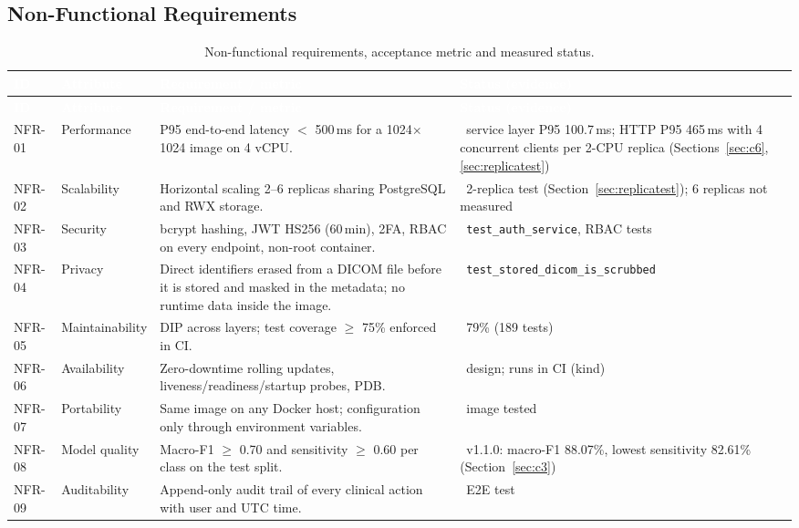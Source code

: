 \documentclass[12pt,a4paper]{article}
\newcommand{\fp}[1]{\nolinkurl{#1}}
\newcommand{\yes}{\textcolor{verdeUAEM}{\ding{51}}}
\newcommand{\hd}[1]{\textcolor{white}{\textbf{#1}}}
\begin{document}
\subsection{Non-Functional Requirements}

\begin{longtable}{C{1.2cm} L{2.2cm} p{6.6cm} L{3.4cm}}
\caption{Non-functional requirements, acceptance metric and measured status.}\label{tab:nonfunctional}\\
\hd{ID} & \hd{Attribute} & \hd{Requirement / metric} & \hd{Status (evidence)} \\
\endfirsthead
{}
\hd{ID} & \hd{Attribute} & \hd{Requirement / metric} & \hd{Status (evidence)} \\
\endhead
{}
NFR-01 & Performance & P95 end-to-end latency $<$ 500\,ms for a 1024$\times$1024 image on 4 vCPU. & \yes\ service layer P95 100.7\,ms; HTTP P95 465\,ms with 4 concurrent clients per 2-CPU replica (Sections~\ref{sec:c6}, \ref{sec:replicatest}) \\
NFR-02 & Scalability & Horizontal scaling 2--6 replicas sharing PostgreSQL and RWX storage. & \yes\ 2-replica test (Section~\ref{sec:replicatest}); 6 replicas not measured \\
NFR-03 & Security & bcrypt hashing, JWT HS256 (60\,min), 2FA, RBAC on every endpoint, non-root container. & \yes\ \texttt{test\_auth\_service}, RBAC tests \\
NFR-04 & Privacy & Direct identifiers erased from a DICOM file before it is stored and masked in the metadata; no runtime data inside the image. & \yes\ \fp{test_stored_dicom_is_scrubbed} \\
NFR-05 & Maintainability & DIP across layers; test coverage $\geq$ 75\% enforced in CI. & \yes\ 79\% (189 tests) \\
NFR-06 & Availability & Zero-downtime rolling updates, liveness/readiness/startup probes, PDB. & \yes\ design; runs in CI (kind) \\
NFR-07 & Portability & Same image on any Docker host; configuration only through environment variables. & \yes\ image tested \\
NFR-08 & Model quality & Macro-F1 $\geq$ 0.70 and sensitivity $\geq$ 0.60 per class on the test split. & \yes\ v1.1.0: macro-F1 88.07\%, lowest sensitivity 82.61\% (Section~\ref{sec:c3}) \\
NFR-09 & Auditability & Append-only audit trail of every clinical action with user and UTC time. & \yes\ E2E test \\
\end{longtable}
\end{document}
